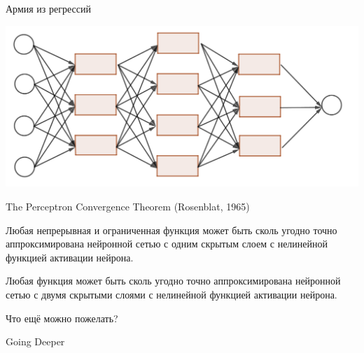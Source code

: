 \documentclass[notes,12pt, aspectratio=169]{beamer}
\newenvironment{wideitemize}{\itemize\addtolength{\itemsep}{10pt}}{\enditemize}
\begin{document}
\begin{frame}{Армия из регрессий}
\begin{center}
	\includegraphics[width=0.8\paperwidth]{network.png}
\end{center}
\end{frame}


\begin{frame}{The Perceptron Convergence Theorem (Rosenblat, 1965)}

\begin{wideitemize}
	\item Любая непрерывная и ограниченная функция может быть сколь угодно точно аппроксимирована нейронной сетью с одним скрытым слоем с нелинейной функцией активации нейрона.
	
	\item Любая функция может быть сколь угодно точно аппроксимирована нейронной сетью с двумя скрытыми слоями с нелинейной функцией активации нейрона.
	
	\item Что ещё можно пожелать?
\end{wideitemize}
\end{frame}


{
	\begin{frame}[fragile]
	\vspace{6.5cm}
	\begin{center}
		{\color{white} \Huge{Going Deeper}}
	\end{center}
\end{frame}
}
\end{document}
